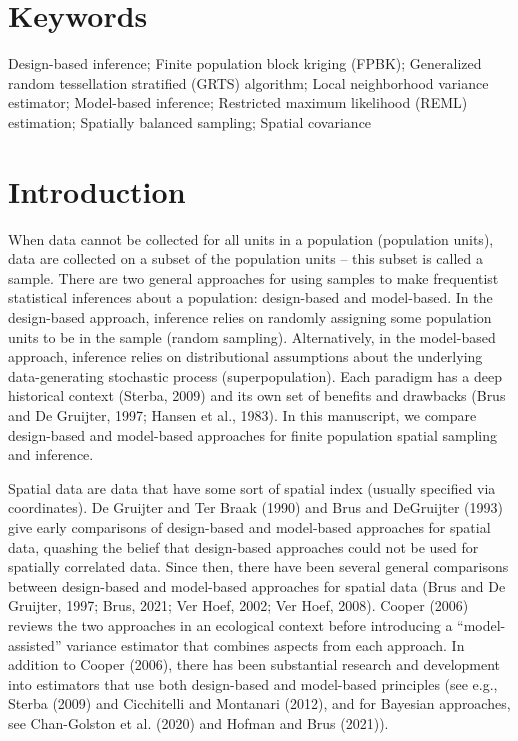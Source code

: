 \documentclass[]{elsarticle} %
\begin{document}
\hypertarget{keywords}{%
\section*{Keywords}\label{keywords}}

Design-based inference; Finite population block kriging (FPBK);
Generalized random tessellation stratified (GRTS) algorithm; Local
neighborhood variance estimator; Model-based inference; Restricted
maximum likelihood (REML) estimation; Spatially balanced sampling;
Spatial covariance

\hypertarget{sec:introduction}{%
\section{Introduction}\label{sec:introduction}}

When data cannot be collected for all units in a population (population
units), data are collected on a subset of the population units -- this
subset is called a sample. There are two general approaches for using
samples to make frequentist statistical inferences about a population:
design-based and model-based. In the design-based approach, inference
relies on randomly assigning some population units to be in the sample
(random sampling). Alternatively, in the model-based approach, inference
relies on distributional assumptions about the underlying
data-generating stochastic process (superpopulation). Each paradigm has
a deep historical context (Sterba, 2009) and its own set of benefits and
drawbacks (Brus and De Gruijter, 1997; Hansen et al., 1983). In this
manuscript, we compare design-based and model-based approaches for
finite population spatial sampling and inference.

Spatial data are data that have some sort of spatial index (usually
specified via coordinates). De Gruijter and Ter Braak (1990) and Brus
and DeGruijter (1993) give early comparisons of design-based and
model-based approaches for spatial data, quashing the belief that
design-based approaches could not be used for spatially correlated data.
Since then, there have been several general comparisons between
design-based and model-based approaches for spatial data (Brus and De
Gruijter, 1997; Brus, 2021; Ver Hoef, 2002; Ver Hoef, 2008). Cooper
(2006) reviews the two approaches in an ecological context before
introducing a ``model-assisted'' variance estimator that combines
aspects from each approach. In addition to Cooper (2006), there has been
substantial research and development into estimators that use both
design-based and model-based principles (see e.g., Sterba (2009) and
Cicchitelli and Montanari (2012), and for Bayesian approaches, see
Chan-Golston et al. (2020) and Hofman and Brus (2021)).
\end{document}
